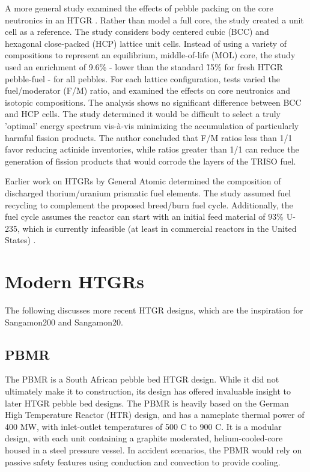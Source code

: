 A more general study examined the effects of pebble packing on the core neutronics in an HTGR \cite{turkmen_effect_2012}.  Rather than model a full core, the study created a unit cell as a reference.  The study considers body centered cubic (BCC) and hexagonal close-packed (HCP) lattice unit cells.  Instead of using a variety of compositions to represent an equilibrium, middle-of-life (MOL) core, the study used an enrichment of 9.6\%  - lower than the standard \~15\% for fresh HTGR pebble-fuel - for all pebbles.  For each lattice configuration, tests varied the fuel/moderator (F/M) ratio, and examined the effects on core neutronics and isotopic compositions.  The analysis shows no significant difference between BCC and HCP cells.  The study determined it would be difficult to select a truly 'optimal' energy spectrum vis-\`{a}-vis minimizing the accumulation of particularly harmful fission products.  The author concluded that F/M ratios less than 1/1 favor reducing actinide inventories, while ratios greater than 1/1 can reduce the generation of fission products that would corrode the layers of the TRISO fuel.

Earlier work on HTGRs by General Atomic determined the composition of discharged thorium/uranium prismatic fuel elements.  The study assumed fuel recycling to complement the proposed breed/burn fuel cycle.  Additionally, the fuel cycle assumes the reactor can start with an initial feed material of 93\% U-235, which is currently infeasible (at least in commercial reactors in the United States) \cite{hamilton_htgr_1976}.


\section{Modern HTGRs}

The following discusses more recent  HTGR designs, which are the inspiration for Sangamon200 and Sangamon20.

\subsection{PBMR}

The PBMR is a South African pebble bed HTGR design.  While it did not ultimately make it to construction, its design has offered invaluable insight to later HTGR pebble bed designs.  The PBMR is heavily based on the German High Temperature Reactor (HTR) design, and has a nameplate thermal power of 400 MW, with inlet-outlet temperatures of 500 \textdegree C to 900 \textdegree C.  It is a modular design, with each unit containing a graphite moderated, helium-cooled-core housed in a steel pressure vessel.  In accident scenarios, the PBMR would rely on passive safety features using conduction and convection to provide cooling.

